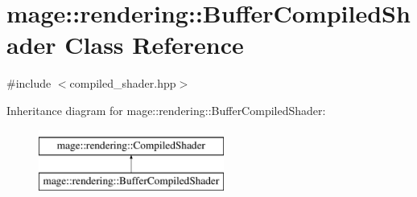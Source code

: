 \hypertarget{classmage_1_1rendering_1_1_buffer_compiled_shader}{}\section{mage\+:\+:rendering\+:\+:Buffer\+Compiled\+Shader Class Reference}
\label{classmage_1_1rendering_1_1_buffer_compiled_shader}


{\ttfamily \#include $<$compiled\+\_\+shader.\+hpp$>$}

Inheritance diagram for mage\+:\+:rendering\+:\+:Buffer\+Compiled\+Shader\+:\begin{figure}[H]
\begin{center}
\leavevmode
\includegraphics[height=2.000000cm]{classmage_1_1rendering_1_1_buffer_compiled_shader}
\end{center}
\end{figure}
